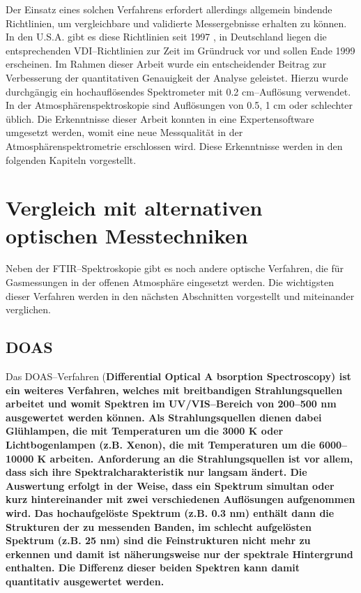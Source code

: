 Der Einsatz eines solchen Verfahrens erfordert allerdings
allgemein bindende Richtlinien, um vergleichbare und validierte
Messergebnisse erhalten zu können. In den U.S.A. gibt es diese
Richtlinien seit 1997 \cite{to1697}, in Deutschland liegen die
entsprechenden VDI--Richtlinien zur Zeit im Gründruck vor
\cite{vdi98} und sollen Ende 1999 erscheinen. Im Rahmen dieser
Arbeit wurde ein entscheidender Beitrag zur Verbesserung der
quantitativen Genauigkeit der Analyse geleistet. Hierzu wurde
durchgängig ein hochauflösendes Spektrometer mit 0.2
cm--Auflösung verwendet. In der Atmosphärenspektroskopie
sind Auflösungen von 0.5, 1 cm oder schlechter üblich. Die
Erkenntnisse dieser Arbeit konnten in eine Expertensoftware
umgesetzt werden, womit eine neue Messqualität in der
Atmosphärenspektrometrie erschlossen wird. Diese Erkenntnisse
werden in den folgenden Kapiteln vorgestellt.\\


\section{\label{anderemesstechniken}Vergleich mit alternativen
optischen Messtechniken}

Neben der FTIR--Spektroskopie gibt es noch andere optische
Verfahren, die für Gasmessungen in der offenen Atmosphäre
eingesetzt werden. Die wichtigsten dieser Verfahren werden in den
nächsten Abschnitten vorgestellt und miteinander verglichen.


\subsection{\label{doas}DOAS}

Das DOAS--Verfahren (\bf D\rm ifferential \bf O\rm ptical \bf A\rm
bsorption \bf S\rm pectroscopy) ist ein weiteres Verfahren,
welches mit breitbandigen Strahlungsquellen arbeitet und womit
Spektren im UV/VIS--Bereich von 200--500 nm ausgewertet werden
können. Als Strahlungsquellen dienen dabei Glühlampen, die mit
Temperaturen um die 3000 K oder Lichtbogenlampen (z.B. Xenon), die
mit Temperaturen um die 6000--10000 K arbeiten. Anforderung an die
Strahlungsquellen ist vor allem, dass sich ihre
Spektralcharakteristik nur langsam ändert. Die Auswertung erfolgt
in der Weise, dass ein Spektrum simultan oder kurz hintereinander
mit zwei verschiedenen Auflösungen aufgenommen wird. Das
hochaufgelöste Spektrum (z.B. 0.3 nm) enthält dann die Strukturen
der zu messenden Banden, im schlecht aufgelösten Spektrum (z.B. 25
nm) sind die Feinstrukturen nicht mehr zu erkennen und damit ist
näherungsweise nur der spektrale Hintergrund enthalten. Die
Differenz dieser beiden Spektren kann damit quantitativ
ausgewertet werden.\\

